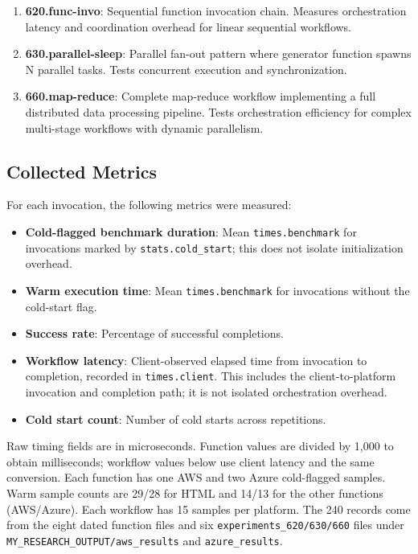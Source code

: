 \documentclass[sigconf,nonacm]{acmart}
\begin{document}
\begin{enumerate}
    \item \textbf{620.func-invo}: Sequential function invocation chain. Measures orchestration latency and coordination overhead for linear sequential workflows.
    \item \textbf{630.parallel-sleep}: Parallel fan-out pattern where generator function spawns N parallel tasks. Tests concurrent execution and synchronization.
    \item \textbf{660.map-reduce}: Complete map-reduce workflow implementing a full distributed data processing pipeline. Tests orchestration efficiency for complex multi-stage workflows with dynamic parallelism.

\end{enumerate}

\subsection{Collected Metrics}

For each invocation, the following metrics were measured:

\begin{itemize}
    \item \textbf{Cold-flagged benchmark duration}: Mean \texttt{times.benchmark} for invocations marked by \texttt{stats.cold\_start}; this does not isolate initialization overhead.
    \item \textbf{Warm execution time}: Mean \texttt{times.benchmark} for invocations without the cold-start flag.
    \item \textbf{Success rate}: Percentage of successful completions.
    \item \textbf{Workflow latency}: Client-observed elapsed time from invocation to completion, recorded in \texttt{times.client}. This includes the client-to-platform invocation and completion path; it is not isolated orchestration overhead.
    \item \textbf{Cold start count}: Number of cold starts across repetitions.
\end{itemize}

Raw timing fields are in microseconds. Function values are divided by 1,000 to obtain milliseconds; workflow values below use client latency and the same conversion. Each function has one AWS and two Azure cold-flagged samples. Warm sample counts are 29/28 for HTML and 14/13 for the other functions (AWS/Azure). Each workflow has 15 samples per platform. The 240 records come from the eight dated function files and six \texttt{experiments\_620/630/660} files under \texttt{MY\_RESEARCH\_OUTPUT/aws\_results} and \texttt{azure\_results}.
\end{document}

